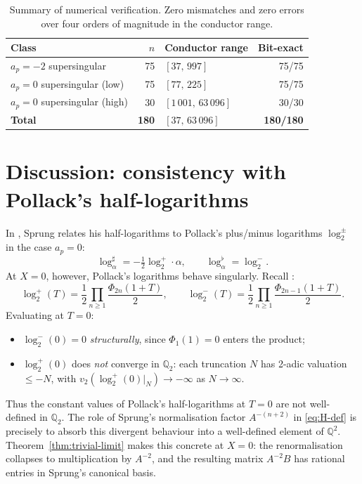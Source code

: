 \documentclass[11pt,a4paper]{amsart}
\theoremstyle{definition}
\newcommand{\Q}{\mathbb{Q}}
\begin{document}
\begin{table}[h]
\centering
\begin{tabular}{l|r|l|r}
Class & $n$ & Conductor range & Bit-exact \\
\hline
$a_p = -2$ supersingular & 75 & $[37,\,997]$ & 75/75 \\
$a_p = 0$ supersingular (low)  & 75 & $[77,\,225]$ & 75/75 \\
$a_p = 0$ supersingular (high) & 30 & $[1\,001,\,63\,096]$ & 30/30 \\
\hline
\textbf{Total} & \textbf{180} & $[37,\,63\,096]$ & \textbf{180/180} \\
\end{tabular}
\caption{Summary of numerical verification. Zero mismatches and zero errors over four orders of magnitude in the conductor range.}
\label{tab:bilanz}
\end{table}

\section{Discussion: consistency with Pollack's half-logarithms}\label{sec:discussion}

In \cite[Remark 6.16]{Sprung2012}, Sprung relates his half-logarithms to Pollack's plus/minus logarithms $\log_2^\pm$ in the case $a_p = 0$:
\begin{equation}\label{eq:remark-6-16}
\log_\alpha^\sharp = -\tfrac{1}{2} \log_2^+ \cdot \alpha, \qquad \log_\alpha^\flat = \log_2^-.
\end{equation}
At $X = 0$, however, Pollack's logarithms behave singularly. Recall \cite[Lemma 4.1]{Pollack2003}:
\begin{equation}
\log_2^+(T) = \frac{1}{2} \prod_{n \geq 1} \frac{\Phi_{2n}(1+T)}{2}, \qquad \log_2^-(T) = \frac{1}{2} \prod_{n \geq 1} \frac{\Phi_{2n-1}(1+T)}{2}.
\end{equation}
Evaluating at $T = 0$:
\begin{itemize}
\item $\log_2^-(0) = 0$ \emph{structurally}, since $\Phi_1(1) = 0$ enters the product;
\item $\log_2^+(0)$ does \emph{not} converge in $\Q_2$: each truncation $N$ has 2-adic valuation $\leq -N$, with $v_2(\log_2^+(0)|_N) \to -\infty$ as $N \to \infty$.
\end{itemize}

Thus the constant values of Pollack's half-logarithms at $T = 0$ are not well-defined in $\Q_2$. The role of Sprung's normalisation factor $A^{-(n+2)}$ in \eqref{eq:H-def} is precisely to absorb this divergent behaviour into a well-defined element of $\Q^2$. Theorem~\ref{thm:trivial-limit} makes this concrete at $X = 0$: the renormalisation collapses to multiplication by $A^{-2}$, and the resulting matrix $A^{-2} B$ has rational entries in Sprung's canonical basis.
\end{document}

